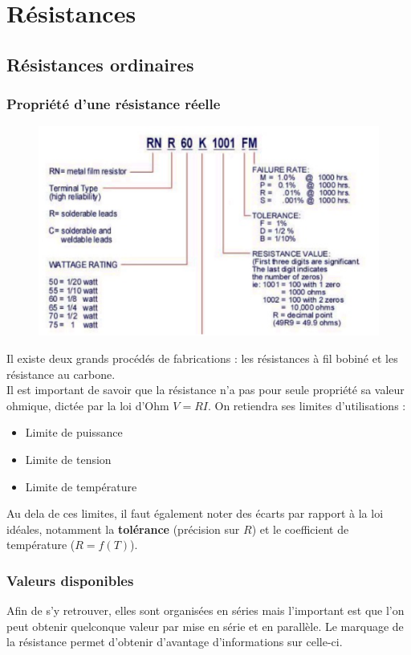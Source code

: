\documentclass	[11pt, a4paper, openany]{book}
\begin{document}
\section{Résistances}
\subsection{Résistances ordinaires}
\subsubsection{Propriété d'une résistance réelle}
\begin{figure}
\includegraphics[scale=0.4]{img/image30.png}
\end{figure}
Il existe deux grands procédés de fabrications : les résistances à fil bobiné et les résistance au carbone.\\
Il est important de savoir que la résistance n'a pas pour seule propriété sa valeur ohmique, dictée par la loi d'Ohm $V = RI$. On retiendra ses limites d'utilisations :
\begin{itemize}
\item Limite de puissance
\item Limite de tension
\item Limite de température
\end{itemize}
Au dela de ces limites, il faut également noter des écarts par rapport à la loi idéales, notamment la \textbf{tolérance} (précision sur $R$) et le coefficient de température ($R = f(T)$).

\subsubsection{Valeurs disponibles}
Afin de s'y retrouver, elles sont organisées en séries mais l'important est que l'on peut obtenir quelconque valeur par mise en série et en parallèle. Le marquage de la résistance permet d'obtenir d'avantage d'informations sur celle-ci.
\end{document}
